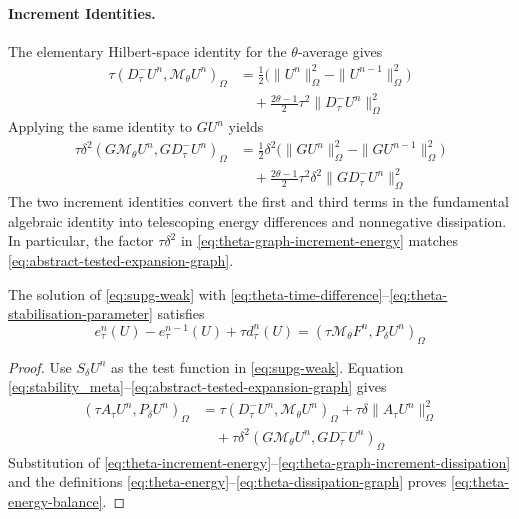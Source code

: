\documentclass[11pt]{article}
\begin{document}
\paragraph{Increment Identities.}
The elementary Hilbert-space identity for the \(\theta\)-average gives
\begin{align}
\tau(D_{\tau}^{-}U^n,\mathcal M_{\theta}U^n)_{\Omega}
&=\frac12\bigl(\|U^n\|_{\Omega}^2-\|U^{n-1}\|_{\Omega}^2\bigr) \label{eq:theta-increment-energy}\\
&\quad+\frac{2\theta-1}{2}\tau^2
\|D_{\tau}^{-}U^n\|_{\Omega}^2 \label{eq:theta-increment-dissipation}
\end{align}
Applying the same identity to \(GU^n\) yields
\begin{align}
\tau\delta^2(G\mathcal M_{\theta}U^n,
GD_{\tau}^{-}U^n)_{\Omega}
&=\frac12\delta^2
\bigl(\|GU^n\|_{\Omega}^2-\|GU^{n-1}\|_{\Omega}^2\bigr) \label{eq:theta-graph-increment-energy}\\
&\quad+\frac{2\theta-1}{2}\tau^2\delta^2
\|GD_{\tau}^{-}U^n\|_{\Omega}^2 \label{eq:theta-graph-increment-dissipation}
\end{align}
The two increment identities convert the first and third terms in the
fundamental algebraic identity into telescoping energy differences and
nonnegative dissipation. In particular, the factor \(\tau\delta^2\) in
\eqref{eq:theta-graph-increment-energy} matches
\eqref{eq:abstract-tested-expansion-graph}.

\begin{prop}
\label{prop:theta-energy}
The solution of \eqref{eq:supg-weak} with
\eqref{eq:theta-time-difference}--\eqref{eq:theta-stabilisation-parameter}
satisfies
\begin{equation}
e_{\tau}^n(U)-e_{\tau}^{n-1}(U)+\tau d_{\tau}^n(U)
=(\tau\mathcal M_{\theta}F^n,P_{\delta}U^n)_{\Omega} \label{eq:theta-energy-balance}
\end{equation}
\end{prop}
\begin{proof}
Use \(S_{\delta}U^n\) as the test function in \eqref{eq:supg-weak}.
Equation \eqref{eq:stability_meta}--\eqref{eq:abstract-tested-expansion-graph}
gives
\begin{align}
(\tau A_{\tau}U^n,P_{\delta}U^n)_{\Omega}
&=\tau(D_{\tau}^{-}U^n,\mathcal M_{\theta}U^n)_{\Omega}
+\tau\delta\|A_{\tau}U^n\|_{\Omega}^2 \label{eq:theta-balance-expansion-main}\\
&\quad+\tau\delta^2(G\mathcal M_{\theta}U^n,
GD_{\tau}^{-}U^n)_{\Omega} \label{eq:theta-balance-expansion-graph}
\end{align}
Substitution of
\eqref{eq:theta-increment-energy}--\eqref{eq:theta-graph-increment-dissipation}
and the definitions \eqref{eq:theta-energy}--\eqref{eq:theta-dissipation-graph}
proves \eqref{eq:theta-energy-balance}.
\end{proof}
\end{document}
